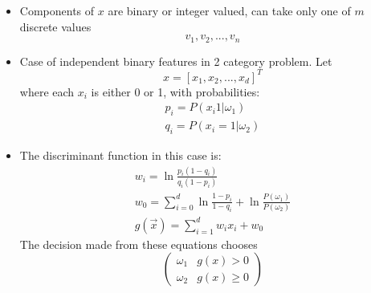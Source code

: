 \documentclass[11pt]{article}
\begin{document}
\begin{itemize}
	\item Components of $x$ are binary or integer valued, can take only one of $m$ discrete values
	\[
	v_1, v_2, ..., v_n
	\]
	\item Case of independent binary features in 2 category problem.  Let 
	\[x = [x_1, x_2, ..., x_d]^T \]
	where each $x_i$ is either 0 or 1, with probabilities:
	\begin{eqnarray}
		p_i = P(x_i 1 | \omega_1) \\
		q_i = P(x_i =1 | \omega_2)
	\end{eqnarray}
	\item The discriminant function in this case is:
	\begin{eqnarray}
		w_i = \ln \frac{p_i (1- q_i)}{q_i (1 - p_i)} \\
		w_0 = \sum_{i=0}^{d}  \ln \frac{1 - p_i }{1 - q_i} + \ln \frac{P( \omega_1) }{ P (\omega_2) } \\
		g(\vec{x}) = \sum _{i=1} ^d w_i x_i + w_0	
	\end{eqnarray} 
	The decision made from these equations chooses 
	\[
\left(
\begin{array}{ll}
\omega_1  &   g(x) > 0  \\
\omega_2  &   g(x) \ge 0  
\end{array}
\right)
\]

	
\end{itemize}





\end{document}
